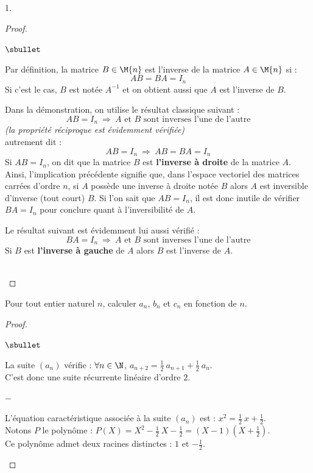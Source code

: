\begin{noliste}{1.}
\begin{proof}
    \newpage


    \begin{remarkL}{.98}%
      \begin{noliste}{$\sbullet$}
      \item Par définition, la matrice $B \in \M{n}$ est l'inverse de
        la matrice $A \in \M{n}$ si :
        \[
        AB = BA = I_n
        \]
        Si c'est le cas, $B$ est notée $A^{-1}$ et on obtient aussi
        que $A$ est l'inverse de $B$.
      \item Dans la démonstration, on utilise le résultat classique
        suivant :
        \[
        AB = I_n \ \Rightarrow \ \text{$A$ et $B$ sont inverses
          l'une de l'autre}
        \]
        {\it (la propriété réciproque est évidemment vérifiée)}\\
        autrement dit :
        \[
        AB = I_n \ \Rightarrow \ AB = BA = I_n
        \]          
        Si $AB = I_n$, on dit que la matrice $B$ est {\bf l'inverse à
          droite} de la matrice $A$. Ainsi, l'implication précédente
        signifie que, dans l'espace vectoriel des matrices carrées
        d'ordre $n$, si $A$ possède une inverse à droite notée $B$
        alors $A$ est inversible d'inverse (tout court) $B$. Si l'on
        sait que $AB = I_n$, il est donc inutile de vérifier $BA =
        I_n$ pour conclure quant à l'inversibilité de $A$.
          
      \item Le résultat suivant est évidemment lui aussi vérifié :
        \[
        BA = I_n \ \Rightarrow \ \text{$A$ et $B$ sont inverses
          l'une de l'autre}
        \]
        Si $B$ est {\bf l'inverse à gauche} de $A$ alors $B$ est
        l'inverse de $A$.
      \end{noliste}
    \end{remarkL}~\\[-1.2cm]
  \end{proof}

\item Pour tout entier naturel $n$, calculer $a_{n}$, $b_{n}$ et
  $c_{n}$ en fonction de $n$.

  \begin{proof}~%
    \begin{noliste}{$\sbullet$}
    \item La suite $(a_n)$ vérifie : $\forall n \in \N$, $a_{n+2} =
      \frac{1}{2} \ a_{n+1} + \frac{1}{2} \ a_n$.\\[.1cm]
      C'est donc une suite récurrente linéaire d'ordre $2$.
      \begin{noliste}{$-$}
      \item L'équation caractéristique associée à la suite $(a_n)$ est
        : $x^2 = \frac{1}{2} \ x + \frac{1}{2}$.\\[.1cm]
        Notons $P$ le polynôme : $P(X) = X^2 - \frac{1}{2} \ X -
        \frac{1}{2} = (X - 1)(X + \frac{1}{2})$.\\[.1cm]
        Ce polynôme admet deux racines distinctes : $1$ et
        $-\frac{1}{2}$.


\end{noliste}
\end{noliste}
\end{proof}
\end{noliste}
